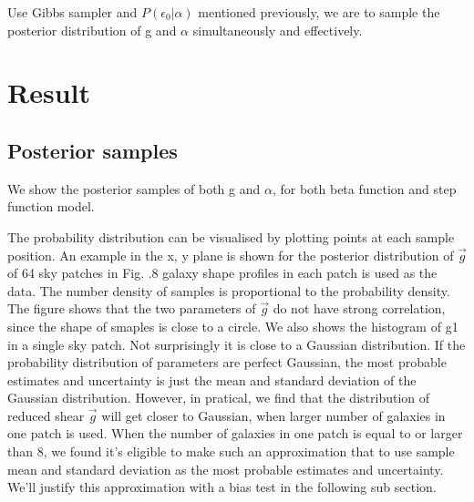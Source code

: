 \documentclass[useAMS,usenatbib]{mn2e}
\begin{document}
Use Gibbs sampler and $P(\epsilon_{0}|\alpha)$ mentioned previously, we
are to sample the posterior distribution of g and $\alpha$ simultaneously
and effectively.




\section{Result}

\label{sec:XXX}


\subsection{Posterior samples}

We show the posterior samples of both g and $\alpha$, for both beta
function and step function model. 

The probability distribution can be visualised by plotting points at each sample
position. An example in the x, y plane is shown for the posterior distribution of
$\vec{g}$ of 64 sky patches in Fig. .8 galaxy shape profiles in each patch is used as the data.
The number density of samples is proportional to the probability density. The figure shows that the two parameters of $\vec{g}$
do not have strong correlation, since the shape of smaples is close to a circle.
We also shows the histogram of g1 in a single sky patch. Not surprisingly it is close to a Gaussian distribution.
If the probability distribution of parameters are perfect Gaussian, the most probable estimates and uncertainty 
is just the mean and standard deviation of the Gaussian distribution. However, in pratical, we find that the distribution 
of reduced shear $\vec{g}$ will  get closer to Gaussian, when larger number of galaxies in one patch  is used. When the number of galaxies in 
one patch is equal to or larger than 8, we found it's eligible to make such an approximation that to use sample mean and standard 
deviation as the most probable estimates and uncertainty. We'll justify this approximation with a bias test in the following
sub section.
\end{document}
